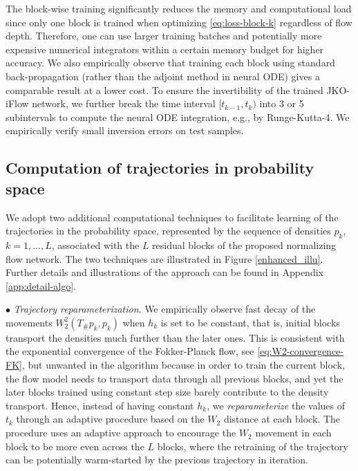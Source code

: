\documentclass{article}
\theoremstyle{remark}
\theoremstyle{plain}
\newcommand{\JKO}{JKO-iFlow}
\begin{document}
{The block-wise training significantly reduces the memory and computational load since only one block is trained when optimizing \eqref{eq:loss-block-k} regardless of flow depth. 
Therefore, one can use larger training batches and potentially more expensive numerical integrators within a certain memory budget for higher accuracy. We also empirically observe that training each block using standard back-propagation (rather than the adjoint method in neural ODE) gives a comparable result at a lower cost. 
%
To ensure the invertibility of the trained \JKO{} network, we further break the time interval $[t_{k-1}, t_k)$ into 3 or 5 subintervals to compute the neural ODE integration, e.g., by Runge-Kutta-4. 
We empirically verify small inversion errors on test samples.



\subsection{Computation of trajectories in probability space}\label{sec:traj_prob_comp}


We adopt two additional computational techniques to facilitate learning of the trajectories in the probability space,
represented by the sequence of densities $p_k$, $k=1, \ldots, L$, 
associated with the $L$ residual blocks of the proposed normalizing flow network. The two techniques are illustrated in Figure \ref{enhanced_illu}.
Further details and illustrations of the approach  can be found in Appendix \ref{app:detail-algo}. 

\vspace{5pt}
$\bullet$ {\it Trajectory reparameterization}. 
We empirically observe fast decay of the movements $W_2^2(T_\# p_k,p_k)$ when $h_k$ is set to be constant,
that is,
initial blocks transport the densities much further than the later ones. 
This is consistent with the exponential convergence of the Fokker-Planck flow, see \eqref{eq:W2-convergence-FK}, but unwanted in the algorithm because in order to train the current block, the flow model needs to transport data through all previous blocks, 
and yet the later blocks trained using constant step size barely contribute to the density transport.
%  
Hence, 
%  
instead of having constant $h_k$, we \textit{reparameterize} the values of $t_k$ through an adaptive procedure based on the $W_2$ distance at each block.
{The procedure uses an adaptive %
approach to encourage the $W_2$ movement in each block to be more even across the $L$ blocks, where the retraining of the trajectory can be potentially warm-started by the previous trajectory in iteration.}

}
\end{document}
